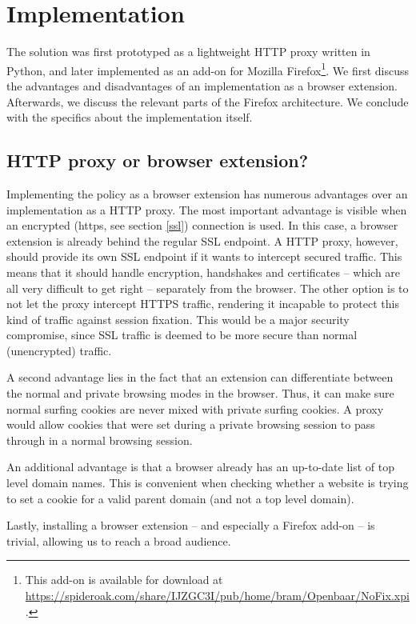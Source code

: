 \section{Implementation}

The solution was first prototyped as a lightweight HTTP proxy written in Python, and later implemented as an add-on for Mozilla Firefox\footnote{This add-on is available for download at \url{https://spideroak.com/share/IJZGC3I/pub/home/bram/Openbaar/NoFix.xpi}.}. We first discuss the advantages and disadvantages of an implementation as a browser extension. Afterwards, we discuss the relevant parts of the Firefox architecture. We conclude with the specifics about the implementation itself.

\subsection{HTTP proxy or browser extension?}

Implementing the policy as a browser extension has numerous advantages over an implementation as a HTTP proxy. The most important advantage is visible when an encrypted (\gls{https}, see section \ref{ssl}) connection is used. In this case, a browser extension is already behind the regular SSL endpoint. A HTTP proxy, however, should provide its own SSL endpoint if it wants to intercept secured traffic. This means that it should handle encryption, handshakes and certificates -- which are all very difficult to get right -- separately from the browser. The other option is to not let the proxy intercept HTTPS traffic, rendering it incapable to protect this kind of traffic against session fixation. This would be a major security compromise, since SSL traffic is deemed to be more secure than normal (unencrypted) traffic.

A second advantage lies in the fact that an extension can differentiate between the normal and private browsing modes in the browser. Thus, it can make sure normal surfing cookies are never mixed with private surfing cookies. A proxy would allow cookies that were set during a private browsing session to pass through in a normal browsing session.

An additional advantage is that a browser already has an up-to-date list of top level domain names. This is convenient when checking whether a website is trying to set a cookie for a valid parent domain (and not a top level domain).

Lastly, installing a browser extension -- and especially a Firefox add-on -- is trivial, allowing us to reach a broad audience.

